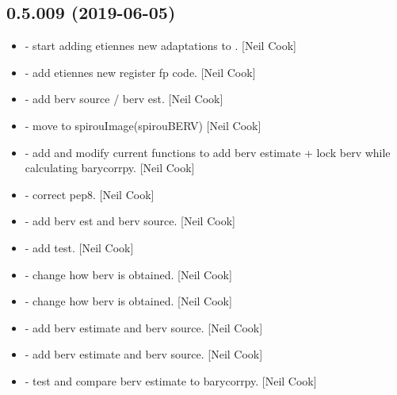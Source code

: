 \documentclass[a4paper,10pt,english]{report}
\begin{document}
\subsection{0.5.009 (2019-06-05)}
\label{\detokenize{misc/changelog:id127}}\begin{itemize}
\item {} 
 - start adding etiennes new adaptations to
. {[}Neil Cook{]}

\item {} 
 - add etiennes new register fp code. {[}Neil Cook{]}

\item {} 
 - add berv source / berv est. {[}Neil Cook{]}

\item {} 
 - move  to spirouImage(spirouBERV)
{[}Neil Cook{]}

\item {} 
 - add  and modify current functions to add
berv estimate + lock berv while calculating barycorrpy. {[}Neil Cook{]}

\item {} 
 - correct pep8. {[}Neil Cook{]}

\item {} 
 - add berv est and berv source. {[}Neil Cook{]}

\item {} 
 - add  test. {[}Neil Cook{]}

\item {} 
 - change how berv is obtained. {[}Neil Cook{]}

\item {} 
 - change how berv is obtained. {[}Neil Cook{]}

\item {} 
 - add berv estimate and berv source. {[}Neil
Cook{]}

\item {} 
 - add berv estimate and berv source. {[}Neil
Cook{]}

\item {} 
 - test and compare berv estimate to
barycorrpy. {[}Neil Cook{]}

\end{itemize}
\end{document}
